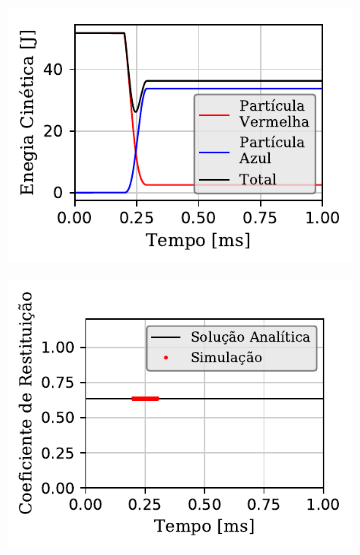 \begin{figure}[htb!]
{\begin{subfigure}[t]{\smallresultsfigwidth}
			\caption{}
			\label{subfig:colliding_spheres:dissipative_rotation:translational_energy}
		\end{subfigure}
		\begin{subfigure}[t]{\smallresultsfigwidth}
			\centering
			\includegraphics[scale=1]{images/colliding_spheres/dissipative_rotation/kineticEnergy_small_total.pdf}
			\caption{}
			\label{subfig:colliding_spheres:dissipative_rotation:kinetic_energy}
		\end{subfigure}
		\begin{subfigure}[t]{\smallresultsfigwidth}
			\centering
			\includegraphics[scale=1]{images/colliding_spheres/dissipative_rotation/coefficient_of_restitution_small.pdf}
			\caption{}
			\label{subfig:colliding_spheres:dissipative_rotation:coefficient_of_restitution}
		\end{subfigure}
	}
	\label{fig:colliding_spheres:dissipative_rotation:energy_and_coefficient_of_restitution_results}
	\sourceMe
\end{figure}

